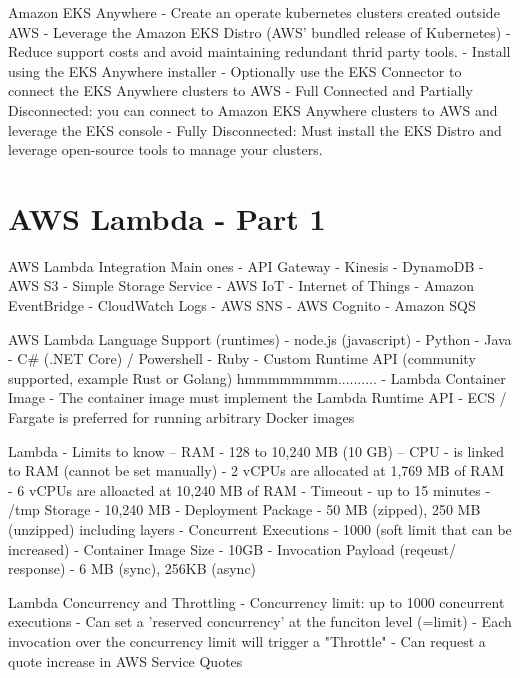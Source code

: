 \documentclass[11pt]{book}
\begin{document}
    Amazon EKS Anywhere
    - Create an operate kubernetes clusters created outside AWS
    - Leverage the Amazon EKS Distro (AWS' bundled release of Kubernetes)
    - Reduce support costs and avoid maintaining redundant thrid party tools.
    - Install using the EKS Anywhere installer
    - Optionally use the EKS Connector to connect the EKS Anywhere clusters to AWS
        - Full Connected and Partially Disconnected: you can connect to Amazon EKS Anywhere clusters to AWS and leverage the EKS console
        - Fully Disconnected: Must install the EKS Distro and leverage open-source tools to manage your clusters.

    \section{AWS Lambda - Part 1}
    AWS Lambda Integration Main ones
    - API Gateway
    - Kinesis
    - DynamoDB
    - AWS S3 - Simple Storage Service
    - AWS IoT - Internet of Things
    - Amazon EventBridge
    - CloudWatch Logs
    - AWS SNS
    - AWS Cognito
    - Amazon SQS


    AWS Lambda Language Support (runtimes)
    - node.js (javascript)
    - Python
    - Java
    - C# (.NET Core) / Powershell
    - Ruby
    - Custom Runtime API (community supported, example Rust or Golang) hmmmmmmmm..........
    - Lambda Container Image
        - The container image must implement the Lambda Runtime API
        - ECS / Fargate is preferred for running arbitrary Docker images

    Lambda - Limits to know
    -- RAM - 128 to 10,240 MB (10 GB)
    -- CPU - is linked to RAM (cannot be set manually)
        - 2 vCPUs are allocated at 1,769 MB of RAM
        - 6 vCPUs are alloacted at 10,240 MB of RAM
    - Timeout - up to 15 minutes
    - /tmp Storage - 10,240 MB
    - Deployment Package - 50 MB (zipped), 250 MB (unzipped) including layers
    - Concurrent Executions - 1000 (soft limit that can be increased)
    - Container Image Size - 10GB
    - Invocation Payload (reqeust/ response) - 6 MB (sync), 256KB (async)

    Lambda Concurrency and Throttling
    - Concurrency limit: up to 1000 concurrent executions
    - Can set a 'reserved concurrency' at the funciton level (=limit)
    - Each invocation over the concurrency limit will trigger a "Throttle"
    - Can request a quote increase in AWS Service Quotes
\end{document}
